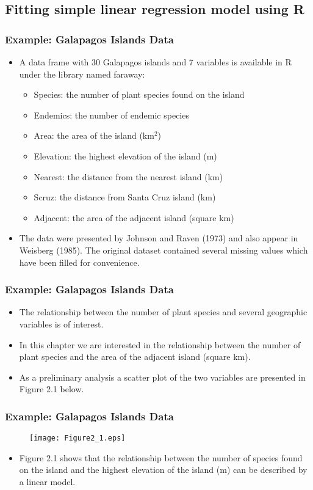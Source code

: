 \documentclass{beamer}
\begin{document}
\subsection{Fitting simple linear regression model using R}
\begin{frame}\frametitle{Example: Galapagos Islands Data}
\begin{itemize}
\item A data frame with 30 Galapagos islands and 7 variables is available in R under the library named faraway:
  \begin{itemize}
     \item Species:  the number of plant species found on the island
     \item Endemics:  the number of endemic species
     \item Area:  the area of the island (km$^2$)
     \item Elevation: the highest elevation of the island (m)
     \item Nearest:  the distance from the nearest island (km)
     \item Scruz:  the distance from Santa Cruz island (km)
     \item Adjacent:  the area of the adjacent island (square km)
  \end{itemize}
\item The data were presented by Johnson and Raven (1973) and also appear in Weisberg (1985). The original dataset contained several missing values which have been filled for convenience.
\end{itemize}
\end{frame}

\begin{frame}[fragile]\frametitle{Example: Galapagos Islands Data}
\begin{itemize}
\item The relationship between the number of plant species and several geographic variables is of interest.
\item In this chapter we are interested in the relationship between the number of plant species and the area of the adjacent island (square km).
\item As a preliminary analysis a scatter plot of the two variables are presented in Figure 2.1 below.
\end{itemize}
\end{frame}

\begin{frame}\frametitle{Example: Galapagos Islands Data}
\begin{figure}[!hbp]
\centering
\texttt{[image: Figure2\_1.eps]}
\end{figure}
\begin{itemize}
\item Figure 2.1 shows that the relationship between the number of species found on the island and the highest elevation of the island (m) can be described by a linear model.
\end{itemize}
\end{frame}
\end{document}
